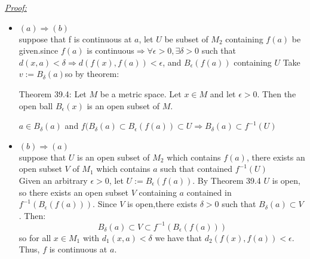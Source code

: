 \documentclass{amsbook}
\begin{document}
\begin{tcolorbox}[enhanced,attach boxed title to top center={yshift=-3mm,yshifttext=-1mm},
  colback=blue!5!white,colframe=blue!75!black,colbacktitle=red!80!black,
  title=Exercise 40.7:,fonttitle=\bfseries,
  boxed title style={size=small,colframe=red!50!black} ]
     \textit{\color{blue}\underline{Proof:}}
\begin{itemize}
    \item {\color{red}$(a)\Rightarrow(b)$}\\
    suppose that f is continuous at $a$, let $U$ be subset of $M_2$ containing $f(a)$ be given.since $f(a)$ is 
    continuous$\Rightarrow\forall\epsilon>0,\exists\delta>0$ such that $d(x,a)<\delta\Rightarrow 
    d(f(x),f(a))<\epsilon$, and $B_\epsilon(f(a))$ containing 
    $U$
    Take $v:=B_{\delta}(a)$so by theorem:
    \begin{tcolorbox}[colback=red!5!white,colframe=red!75!black]
{\color{red}Theorem 39.4:}
Let $M$ be a metric space. Let $x\in M$ and let $\epsilon> 0.$ Then the open ball $B_\epsilon (x)$ is an open 
subset of $M$.
 \end{tcolorbox}
 $a\in B_\delta (a)$ and $f(B_\delta (a)\subset B_\epsilon (f(a))\subset U \Rightarrow B_\delta(a)\subset 
 f^{-1}(U)$
\item {\color{red}$(b)\Rightarrow(a)$}\\
suppose that  $U$ is an open subset of $M_2$ which contains $f(a)$, there exists an open subset $V$ of $M_1$ 
which contains $a$ such that contained 
$f^{-1}(U)$\\
Given an arbitrary $\epsilon>0$, let $U := B_\epsilon(f(a))$. By Theorem 39.4 $U$ is open, so there exists an 
open subset $V$ containing $a$ contained in 
$f^{-1}(B_\epsilon(f(a))).$ Since $V$ is open,there exists $\delta>0$ such that $B_\delta(a)\subset V$ . Then:
$$B_\delta(a)\subset V\subset f^{-1}(B_\epsilon(f(a)))$$
so for all $x\in M_1$ with $d_1(x, a)<\delta$ we have that $d_2(f(x), f(a))<\epsilon$. Thus, $f$ is continuous 
at $a$.
\end{itemize}
\end{tcolorbox}

\end{document}
